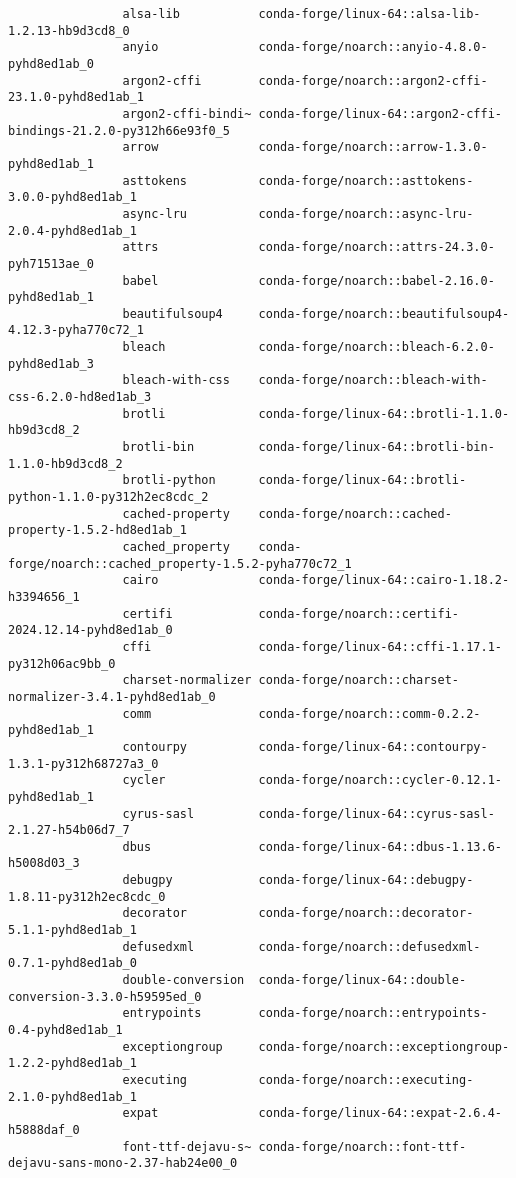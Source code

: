 \documentclass{article}
\begin{document}
\begin{itemize}
\begin{itemize}
\begin{itemize}
\begin{verbatim}
				alsa-lib           conda-forge/linux-64::alsa-lib-1.2.13-hb9d3cd8_0 
				anyio              conda-forge/noarch::anyio-4.8.0-pyhd8ed1ab_0 
				argon2-cffi        conda-forge/noarch::argon2-cffi-23.1.0-pyhd8ed1ab_1 
				argon2-cffi-bindi~ conda-forge/linux-64::argon2-cffi-bindings-21.2.0-py312h66e93f0_5 
				arrow              conda-forge/noarch::arrow-1.3.0-pyhd8ed1ab_1 
				asttokens          conda-forge/noarch::asttokens-3.0.0-pyhd8ed1ab_1 
				async-lru          conda-forge/noarch::async-lru-2.0.4-pyhd8ed1ab_1 
				attrs              conda-forge/noarch::attrs-24.3.0-pyh71513ae_0 
				babel              conda-forge/noarch::babel-2.16.0-pyhd8ed1ab_1 
				beautifulsoup4     conda-forge/noarch::beautifulsoup4-4.12.3-pyha770c72_1 
				bleach             conda-forge/noarch::bleach-6.2.0-pyhd8ed1ab_3 
				bleach-with-css    conda-forge/noarch::bleach-with-css-6.2.0-hd8ed1ab_3 
				brotli             conda-forge/linux-64::brotli-1.1.0-hb9d3cd8_2 
				brotli-bin         conda-forge/linux-64::brotli-bin-1.1.0-hb9d3cd8_2 
				brotli-python      conda-forge/linux-64::brotli-python-1.1.0-py312h2ec8cdc_2 
				cached-property    conda-forge/noarch::cached-property-1.5.2-hd8ed1ab_1 
				cached_property    conda-forge/noarch::cached_property-1.5.2-pyha770c72_1 
				cairo              conda-forge/linux-64::cairo-1.18.2-h3394656_1 
				certifi            conda-forge/noarch::certifi-2024.12.14-pyhd8ed1ab_0 
				cffi               conda-forge/linux-64::cffi-1.17.1-py312h06ac9bb_0 
				charset-normalizer conda-forge/noarch::charset-normalizer-3.4.1-pyhd8ed1ab_0 
				comm               conda-forge/noarch::comm-0.2.2-pyhd8ed1ab_1 
				contourpy          conda-forge/linux-64::contourpy-1.3.1-py312h68727a3_0 
				cycler             conda-forge/noarch::cycler-0.12.1-pyhd8ed1ab_1 
				cyrus-sasl         conda-forge/linux-64::cyrus-sasl-2.1.27-h54b06d7_7 
				dbus               conda-forge/linux-64::dbus-1.13.6-h5008d03_3 
				debugpy            conda-forge/linux-64::debugpy-1.8.11-py312h2ec8cdc_0 
				decorator          conda-forge/noarch::decorator-5.1.1-pyhd8ed1ab_1 
				defusedxml         conda-forge/noarch::defusedxml-0.7.1-pyhd8ed1ab_0 
				double-conversion  conda-forge/linux-64::double-conversion-3.3.0-h59595ed_0 
				entrypoints        conda-forge/noarch::entrypoints-0.4-pyhd8ed1ab_1 
				exceptiongroup     conda-forge/noarch::exceptiongroup-1.2.2-pyhd8ed1ab_1 
				executing          conda-forge/noarch::executing-2.1.0-pyhd8ed1ab_1 
				expat              conda-forge/linux-64::expat-2.6.4-h5888daf_0 
				font-ttf-dejavu-s~ conda-forge/noarch::font-ttf-dejavu-sans-mono-2.37-hab24e00_0 

\end{verbatim}
\end{itemize}
\end{itemize}
\end{itemize}
\end{document}
